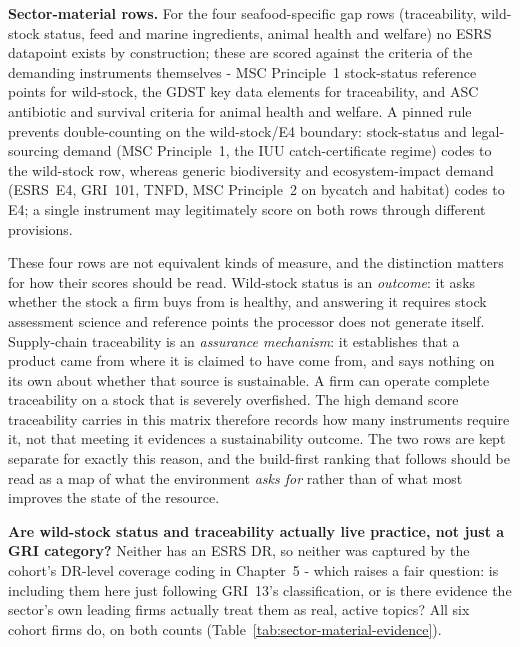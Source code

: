 \textbf{Sector-material rows.} For the four seafood-specific gap rows
(traceability, wild-stock status, feed and marine ingredients, animal health and
welfare) no ESRS datapoint exists by construction; these are scored against the
criteria of the demanding instruments themselves - MSC Principle~1 stock-status
reference points for wild-stock, the GDST key data elements for traceability, and
ASC antibiotic and survival criteria for animal health and welfare. A pinned rule
prevents double-counting on the wild-stock/E4 boundary: stock-status and
legal-sourcing demand (MSC Principle~1, the IUU catch-certificate regime) codes
to the wild-stock row, whereas generic biodiversity and
ecosystem-impact demand (ESRS~E4, GRI~101, TNFD, MSC Principle~2 on bycatch and
habitat) codes to E4; a single instrument may legitimately score on both rows
through different provisions.

These four rows are not equivalent kinds of measure, and the distinction matters
for how their scores should be read. Wild-stock status is an \emph{outcome}: it
asks whether the stock a firm buys from is healthy, and answering it requires
stock assessment science and reference points the processor does not generate
itself. Supply-chain traceability is an \emph{assurance mechanism}: it
establishes that a product came from where it is claimed to have come from, and
says nothing on its own about whether that source is sustainable. A firm can
operate complete traceability on a stock that is severely overfished. The high
demand score traceability carries in this matrix therefore records how many
instruments require it, not that meeting it evidences a sustainability outcome.
The two rows are kept separate for exactly this reason, and the build-first
ranking that follows should be read as a map of what the environment
\emph{asks for} rather than of what most improves the state of the resource.

\textbf{Are wild-stock status and traceability actually live practice, not
just a GRI category?} Neither has an ESRS DR, so neither was captured by the
cohort's DR-level coverage coding in Chapter~5 - which raises a fair
question: is including them here just following GRI~13's classification, or
is there evidence the sector's own leading firms actually treat them as
real, active topics? All six cohort firms do, on both counts
(Table~\ref{tab:sector-material-evidence}).

